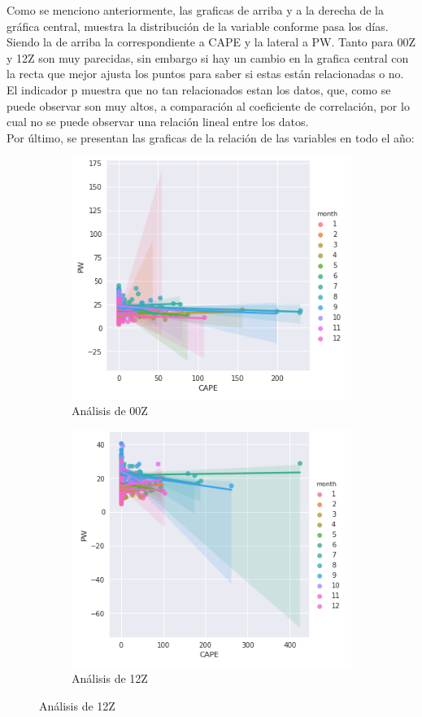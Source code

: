 \documentclass[12pt]{article}
\begin{document}
Como se menciono anteriormente, las graficas de arriba y a la derecha de la gráfica central, muestra la distribución de la variable conforme pasa los días. Siendo la de arriba la correspondiente a CAPE y la lateral a PW. Tanto para 00Z y 12Z son muy parecidas, sin embargo si hay un cambio en la grafica central con la recta que mejor ajusta los puntos para saber si estas están relacionadas o no. El indicador p muestra que no tan relacionados estan los datos, que, como se puede observar son muy altos, a comparación al coeficiente de correlación, por lo cual no se puede observar una relación lineal entre los datos. \\

Por último, se presentan las graficas de la relación de las variables en todo el año:

\begin{figure}[h!]
\begin{subfigure}{.55\textwidth}
  \centering
  \includegraphics[width=.8\linewidth]{lm_00Z.png}
  \caption{Análisis de 00Z}
  \label{fig:sfig1}
\end{subfigure}
\begin{subfigure}{.55\textwidth}
  \centering
  \includegraphics[width=.8\linewidth]{lm_12Z.png}
  \caption{Análisis de 12Z}
  \label{fig:sfig2}
\end{subfigure}
\end{figure}
\end{document}
